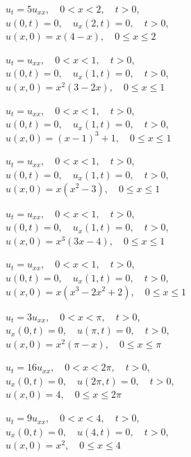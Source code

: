 \begin{exerciselist}
\item\label{exer:12.1.27}$u_t=5u_{xx},\quad 0<x<2,\quad t>0$,\\
$u(0,t)=0,\quad u_x(2,t)=0,\quad t>0$,\\
$u(x,0)=x(4-x),\quad 0\le x\le 2$

\item\label{exer:12.1.28}$u_t=u_{xx},\quad 0<x<1,\quad t>0$,\\
$u(0,t)=0,\quad u_x(1,t)=0,\quad t>0$,\\
$u(x,0)=x^2(3-2x),\quad 0\le x\le 1$

\item\label{exer:12.1.29}$u_t=u_{xx},\quad 0<x<1,\quad t>0$,\\
$u(0,t)=0,\quad u_x(1,t)=0,\quad t>0$,\\
$u(x,0)=(x-1)^3+1,\quad 0\le x\le 1$

\item\label{exer:12.1.30}\Cex
$u_t=u_{xx},\quad 0<x<1,\quad t>0$,\\
$u(0,t)=0,\quad u_x(1,t)=0,\quad t>0$,\\
$u(x,0)=x(x^2-3),\quad 0\le x\le 1$

\item\label{exer:12.1.31}$u_t=u_{xx},\quad 0<x<1,\quad t>0$,\\
$u(0,t)=0,\quad u_x(1,t)=0,\quad t>0$,\\
$u(x,0)=x^3(3x-4),\quad 0\le x\le 1$

\item\label{exer:12.1.32}$u_t=u_{xx},\quad 0<x<1,\quad t>0$,\\
$u(0,t)=0,\quad u_x(1,t)=0,\quad t>0$,\\
$u(x,0)=x(x^3-2x^2+2),\quad 0\le x\le 1$


\item\label{exer:12.1.33}$u_t=3u_{xx},\quad 0<x<\pi,\quad t>0$,\\
$u_x(0,t)=0,\quad u(\pi,t)=0,\quad t>0$,\\
$u(x,0)=x^2(\pi-x),\quad 0\le x\le \pi$


\item\label{exer:12.1.34}$u_t=16u_{xx},\quad 0<x<2\pi,\quad t>0$,\\
$u_x(0,t)=0,\quad u(2\pi,t)=0,\quad t>0$,\\
$u(x,0)=4,\quad 0\le x\le 2\pi$

\item\label{exer:12.1.35}$u_t=9u_{xx},\quad 0<x<4,\quad t>0$,\\
$u_x(0,t)=0,\quad u(4,t)=0,\quad t>0$,\\
$u(x,0)=x^2,\quad 0\le x\le 4$



\end{exerciselist}
